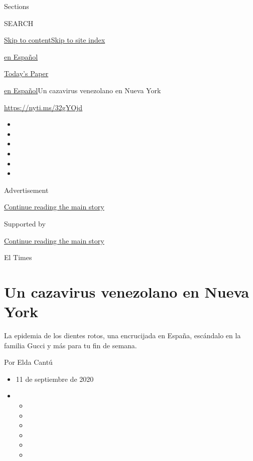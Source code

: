 Sections

SEARCH

\protect\hyperlink{site-content}{Skip to
content}\protect\hyperlink{site-index}{Skip to site index}

\href{https://www.nytimes3xbfgragh.onion/es/}{en Español}

\href{https://myaccount.nytimes3xbfgragh.onion/auth/login?response_type=cookie\&client_id=vi}{}

\href{https://www.nytimes3xbfgragh.onion/section/todayspaper}{Today's
Paper}

\href{/es/}{en Español}\textbar{}Un cazavirus venezolano en Nueva York

\url{https://nyti.ms/32gYOjd}

\begin{itemize}
\item
\item
\item
\item
\item
\item
\end{itemize}

Advertisement

\protect\hyperlink{after-top}{Continue reading the main story}

Supported by

\protect\hyperlink{after-sponsor}{Continue reading the main story}

El Times

\hypertarget{un-cazavirus-venezolano-en-nueva-york}{%
\section{Un cazavirus venezolano en Nueva
York}\label{un-cazavirus-venezolano-en-nueva-york}}

La epidemia de los dientes rotos, una encrucijada en España, escándalo
en la familia Gucci y más para tu fin de semana.

Por Elda Cantú

\begin{itemize}
\item
  11 de septiembre de 2020
\item
  \begin{itemize}
  \item
  \item
  \item
  \item
  \item
  \item
  \end{itemize}
\end{itemize}

